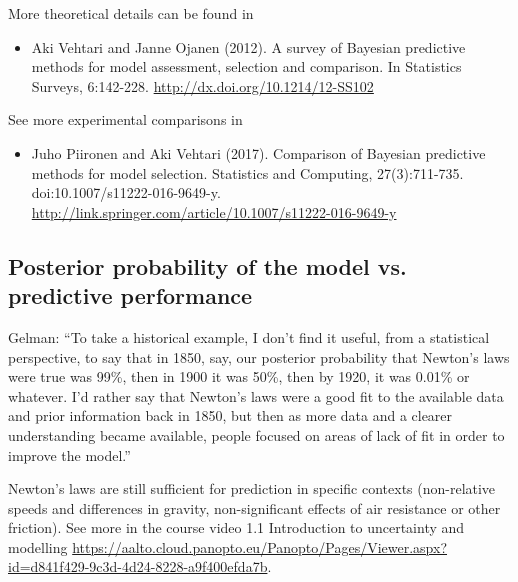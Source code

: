 \documentclass[a4paper,11pt,english]{article}
\begin{document}
More theoretical details can be found in
\begin{itemize}
\item Aki Vehtari and Janne Ojanen (2012). A survey of Bayesian
  predictive methods for model assessment, selection and
  comparison. In Statistics Surveys,
  6:142-228. \url{http://dx.doi.org/10.1214/12-SS102}
\end{itemize}

\noindent
See more experimental comparisons in 
\begin{itemize}
\item   Juho Piironen and Aki Vehtari (2017). Comparison of Bayesian predictive methods for model selection. Statistics and Computing, 27(3):711-735. doi:10.1007/s11222-016-9649-y. \url{http://link.springer.com/article/10.1007/s11222-016-9649-y}
\end{itemize}

\subsection*{Posterior probability of the model vs. predictive performance}

Gelman: ``To take a historical example, I don't find it useful, from a
statistical perspective, to say that in 1850, say, our posterior
probability that Newton's laws were true was 99\%, then in 1900 it was
50\%, then by 1920, it was 0.01\% or whatever. I'd rather say that
Newton's laws were a good fit to the available data and prior
information back in 1850, but then as more data and a clearer
understanding became available, people focused on areas of lack of fit
in order to improve the model.''

Newton's laws are still sufficient for prediction in specific contexts
(non-relative speeds and differences in gravity, non-significant
effects of air resistance or other friction). See more in the course
video 1.1 Introduction to uncertainty and modelling
\url{https://aalto.cloud.panopto.eu/Panopto/Pages/Viewer.aspx?id=d841f429-9c3d-4d24-8228-a9f400efda7b}.
\end{document}
